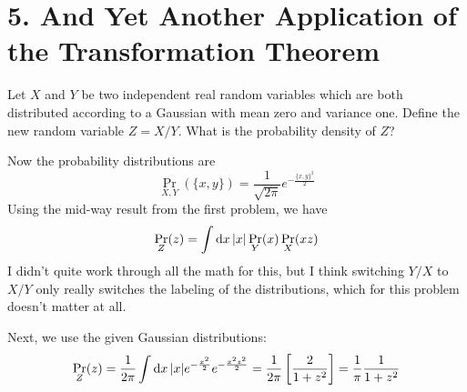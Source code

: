\documentclass[a4paper,twoside]{article}
\begin{document}
\section*{5. And Yet Another Application of the Transformation Theorem}
Let $ X $ and $ Y $ be two independent real random variables which are both distributed according to a Gaussian with mean zero and variance one. Define the new random variable $ Z = X/Y $. What is the probability density of $ Z $?
\begin{problem}
    Now the probability distributions are
    \begin{equation}
        \Pr_{X,Y}(\{x,y\}) = \frac{1}{\sqrt{2 \pi}} e^{- \frac{\{x,y\}^2}{2}}
    \end{equation}
    Using the mid-way result from the first problem, we have
    \begin{equation}
        \Pr_{Z}(z) = \int \dd{x} \abs{x} \Pr_{Y}(x) \Pr_{X}(xz) 
    \end{equation}
    I didn't quite work through all the math for this, but I think switching $ Y/X $ to $ X/Y $ only really switches the labeling of the distributions, which for this problem doesn't matter at all.

    Next, we use the given Gaussian distributions:
    \begin{equation}
        \Pr_{Z}(z) = \frac{1}{2 \pi} \int \dd{x} \abs{x} e^{- \frac{x^2}{2}} e^{- \frac{x^2 z^2}{2}} = \frac{1}{2 \pi} \left[ \frac{2}{1 + z^2} \right] = \frac{1}{\pi} \frac{1}{1 + z^2}
    \end{equation}
\end{problem}
\end{document}
